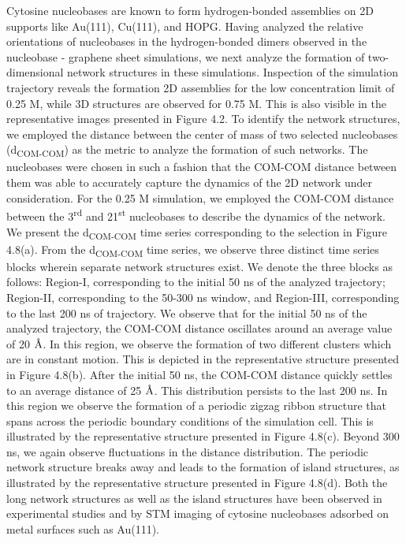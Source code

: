 Cytosine nucleobases are known to form hydrogen-bonded assemblies on 2D supports like Au(111),\supercite{kelly_understanding_2008, otero_elementary_2008} Cu(111), and HOPG.\supercite{xu_directional_2021} Having analyzed the relative orientations of nucleobases in the hydrogen-bonded dimers observed in the nucleobase - graphene sheet simulations, we next analyze the formation of two-dimensional network structures in these simulations. Inspection of the simulation trajectory reveals the formation 2D assemblies for the low concentration limit of 0.25 M, while 3D structures are observed for 0.75 M. This is also visible in the representative images presented in Figure 4.2. To identify the network structures, we employed the distance between the center of mass of two selected nucleobases (d\textsubscript{COM-COM}) as the metric to analyze the formation of such networks. The nucleobases were chosen in such a fashion that the COM-COM distance between them was able to accurately capture the dynamics of the 2D network under consideration. For the 0.25 M simulation, we employed the COM-COM distance between the 3\textsuperscript{rd} and 21\textsuperscript{st} nucleobases to describe the dynamics of the network. We present the d\textsubscript{COM-COM} time series corresponding to the selection in Figure 4.8(a). From the d\textsubscript{COM-COM} time series, we observe three distinct time series blocks wherein separate network structures exist. We denote the three blocks as follows: Region-I, corresponding to the initial 50 ns of the analyzed trajectory; Region-II, corresponding to the 50-300 ns window, and Region-III, corresponding to the last 200 ns of trajectory. We observe that for the initial 50 ns of the analyzed trajectory, the COM-COM distance oscillates around an average value of 20 $\text{\normalfont\AA}$. In this region, we observe the formation of two different clusters which are in constant motion. This is depicted in the representative structure presented in Figure 4.8(b). After the initial 50 ns, the COM-COM distance quickly settles to an average distance of 25 $\text{\normalfont\AA}$. This distribution persists to the last 200 ns. In this region we observe the formation of a periodic zigzag ribbon structure that spans across the periodic boundary conditions of the simulation cell. This is illustrated by the representative structure presented in Figure 4.8(c). Beyond 300 ns, we again observe fluctuations in the distance distribution. The periodic network structure breaks away and leads to the formation of island structures, as illustrated by the representative structure presented in Figure 4.8(d). Both the long network structures as well as the island structures have been observed in experimental studies and by STM imaging of cytosine nucleobases adsorbed on metal surfaces such as Au(111).\supercite{kelly_understanding_2008,wandlowski_structure_1996,iakhnenko_adsorption_2013,hsu_stm_2021}

